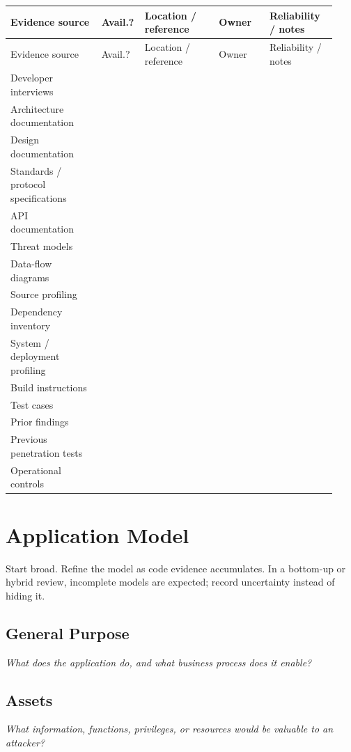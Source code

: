 \documentclass[10pt]{article}
\newcommand{\workarea}[1]{\par\smallskip\noindent\begin{tcolorbox}[height=#1,colback=white,colframe=linegray,boxrule=0.5pt,arc=0pt,left=2pt,right=2pt,top=2pt,bottom=2pt]\mbox{}\end{tcolorbox}\par}
\begin{document}
\begin{longtable}{@{}L{0.27\linewidth}C{0.09\linewidth}L{0.22\linewidth}L{0.15\linewidth}L{0.20\linewidth}@{}}
\toprule
Evidence source & Avail.? & Location / reference & Owner & Reliability / notes \\
\midrule
\endfirsthead
\toprule
Evidence source & Avail.? & Location / reference & Owner & Reliability / notes \\
\midrule
\endhead
Developer interviews & & & & \\
Architecture documentation & & & & \\
Design documentation & & & & \\
Standards / protocol specifications & & & & \\
API documentation & & & & \\
Threat models & & & & \\
Data-flow diagrams & & & & \\
Source profiling & & & & \\
Dependency inventory & & & & \\
System / deployment profiling & & & & \\
Build instructions & & & & \\
Test cases & & & & \\
Prior findings & & & & \\
Previous penetration tests & & & & \\
Operational controls & & & & \\
\bottomrule
\end{longtable}
\clearpage

\section{Application Model}
Start broad. Refine the model as code evidence accumulates. In a bottom-up or hybrid review, incomplete models are expected; record uncertainty instead of hiding it.

\subsection{General Purpose}
\textit{What does the application do, and what business process does it enable?}
\workarea{1.0in}

\subsection{Assets}
\textit{What information, functions, privileges, or resources would be valuable to an attacker?}
\workarea{1.0in}
\end{document}

